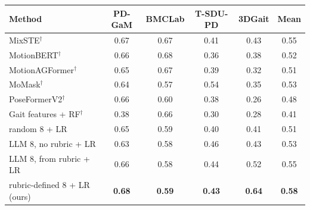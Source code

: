 \begin{tabular}{@{}lccccc@{}}
\toprule
Method & PD-GaM & BMCLab & T-SDU-PD & 3DGait & Mean \\
\midrule
MixSTE$^\dagger$ & 0.67 & 0.67 & 0.41 & 0.43 & 0.55 \\
MotionBERT$^\dagger$ & 0.66 & 0.68 & 0.36 & 0.38 & 0.52 \\
MotionAGFormer$^\dagger$ & 0.65 & 0.67 & 0.39 & 0.32 & 0.51 \\
MoMask$^\dagger$ & 0.64 & 0.57 & 0.54 & 0.35 & 0.53 \\
PoseFormerV2$^\dagger$ & 0.66 & 0.60 & 0.38 & 0.26 & 0.48 \\
Gait features + RF$^\dagger$ & 0.38 & 0.66 & 0.30 & 0.28 & 0.41 \\
\midrule
random 8 + LR & 0.65 & 0.59 & 0.40 & 0.41 & 0.51 \\
LLM 8, no rubric + LR & 0.63 & 0.58 & 0.46 & 0.43 & 0.53 \\
LLM 8, from rubric + LR & 0.66 & 0.58 & 0.44 & 0.52 & 0.55 \\
rubric-defined 8 + LR (ours) & \textbf{0.68} & \textbf{0.59} & \textbf{0.43} & \textbf{0.64} & \textbf{0.58} \\
\bottomrule
\end{tabular}
